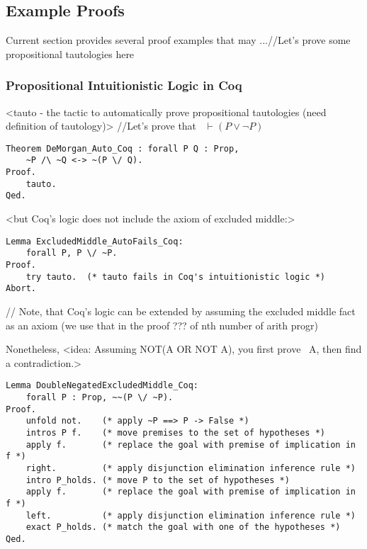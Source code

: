 \documentclass[article]{aaltoseries}
\begin{document}


\subsection{Example Proofs}

Current section provides several proof examples that may ...//Let's prove some propositional tautologies here

\subsubsection{Propositional Intuitionistic Logic in Coq}

<tauto - the tactic to automatically prove propositional tautologies (need definition of tautology)>
//Let's prove that ~$\vdash (P \lor \neg P) $
\begin{lstlisting}[language=coq]
Theorem DeMorgan_Auto_Coq : forall P Q : Prop, 
    ~P /\ ~Q <-> ~(P \/ Q).
Proof.
    tauto.
Qed.
\end{lstlisting}


<but Coq's logic does not include the axiom of excluded middle:>
\begin{lstlisting}[language=coq]
Lemma ExcludedMiddle_AutoFails_Coq:
    forall P, P \/ ~P.
Proof.
    try tauto.  (* tauto fails in Coq's intuitionistic logic *)
Abort.
\end{lstlisting}

// Note, that Coq's logic can be extended by assuming the excluded middle fact as an axiom (we use that in the proof ??? of nth number of arith progr)

Nonetheless, <idea: Assuming NOT(A OR NOT A), you first prove ~A, then find a contradiction.>

\begin{lstlisting}[language=coq]
Lemma DoubleNegatedExcludedMiddle_Coq:
    forall P : Prop, ~~(P \/ ~P).
Proof.
    unfold not.    (* apply ~P ==> P -> False *)
    intros P f.    (* move premises to the set of hypotheses *)
    apply f.       (* replace the goal with premise of implication in f *)
    right.         (* apply disjunction elimination inference rule *)
    intro P_holds. (* move P to the set of hypotheses *)
    apply f.       (* replace the goal with premise of implication in f *)
    left.          (* apply disjunction elimination inference rule *)
    exact P_holds. (* match the goal with one of the hypotheses *)
Qed.
\end{lstlisting}
\end{document}
